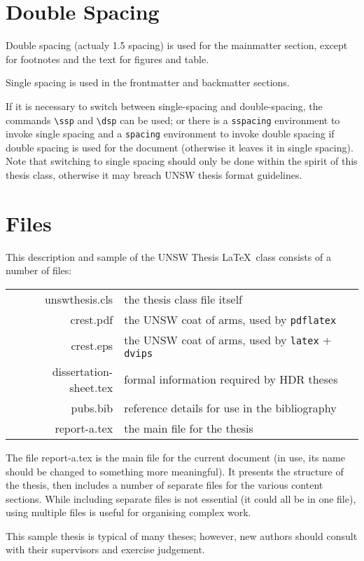 \section{Double Spacing}
Double spacing (actualy 1.5 spacing) is used for the mainmatter section, except for
footnotes and the text for figures and table.

Single spacing is used in the frontmatter and backmatter sections.

If it is necessary to switch between single-spacing and double-spacing, the commands \verb+\ssp+ and \verb+\dsp+ can be used; or there is a \verb+sspacing+ environment to invoke single spacing and a \verb+spacing+ environment to invoke double spacing if double spacing is used for the document (otherwise it leaves it in single spacing).  Note that switching to single spacing should only be done within the spirit of this thesis class, otherwise it may breach UNSW thesis format guidelines.

\section{Files}

This description and sample of the UNSW Thesis \LaTeX\ class consists of a number of files:

\quad\begin{tabular}{rl}
unswthesis.cls & the thesis class file itself\\[2ex]
crest.pdf & the UNSW coat of arms, used by \verb+pdflatex+ \\
crest.eps & the UNSW coat of arms, used by \verb+latex+ + \verb+dvips+ \\[2ex]
dissertation-sheet.tex & formal information required by HDR theses\\[2ex]
pubs.bib & reference details for use in the bibliography\\[2ex]
report-a.tex & the main file for the thesis
\end{tabular}

The file report-a.tex is the main file for the current document (in use,
its name should be changed to something more meaningful).  It presents
the structure of the thesis, then includes a number of separate files
for the various content sections.  While including separate files is
not essential (it could all be in one file), using multiple files is
useful for organising complex work.

This sample thesis is typical of many theses; however, new authors should
consult with their supervisors and exercise judgement.

